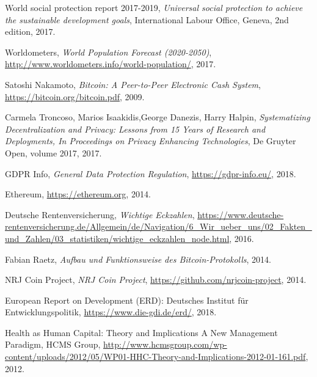 \begin{thebibliography}{9}

  World social protection report 2017-2019,
   \textit{Universal social protection to achieve the sustainable development goals},
  International Labour Office, Geneva,
  2nd edition,
  2017.

  Worldometers,
  \textit{World Population Forecast (2020-2050)},
  \url{http://www.worldometers.info/world-population/},
  2017.  

  Satoshi Nakamoto,
  \textit{Bitcoin: A Peer-to-Peer Electronic Cash System},
  \url{https://bitcoin.org/bitcoin.pdf},
  2009.
  
  Carmela Troncoso, Marios Isaakidis,George Danezis, Harry Halpin,
  \textit{Systematizing Decentralization and Privacy: Lessons from 15 Years of Research and Deployments, In Proceedings on Privacy Enhancing Technologies},
  De Gruyter Open,
  volume 2017,
  2017.

  
  GDPR Info,
  \textit{General Data Protection Regulation},
  \url{https://gdpr-info.eu/},
  2018. 
  
  Ethereum,
  \url{https://ethereum.org},
  2014.

  Deutsche Rentenversicherung,
  \textit{Wichtige Eckzahlen},
  \url{https://www.deutsche-rentenversicherung.de/Allgemein/de/Navigation/6_Wir_ueber_uns/02_Fakten_und_Zahlen/03_statistiken/wichtige_eckzahlen_node.html},
  2016.

  Fabian Raetz,
  \textit{Aufbau und Funktionsweise des Bitcoin-Protokolls},
  2014.  

  NRJ Coin Project,
  \textit{NRJ Coin Project},
  \url{https://github.com/nrjcoin-project},
  2014.

  European Report on Development (ERD): Deutsches Institut für Entwicklungspolitik,
  \url{https://www.die-gdi.de/erd/},
  2018.
  
  Health as Human Capital: Theory and Implications A New Management Paradigm, HCMS Group,
  \url{http://www.hcmsgroup.com/wp-content/uploads/2012/05/WP01-HHC-Theory-and-Implications-2012-01-161.pdf},
  2012.
 

\end{thebibliography}


